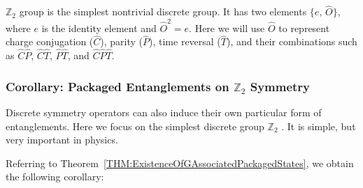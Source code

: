 \documentclass[12pt,a4paper]{article}
\begin{document}
$\mathbb{Z}_2$ group is the simplest nontrivial discrete group.
It has two elements $\{e,\,\hat{O}\}$, where $e$ is the identity element and $\hat{O}^2 = e$.
Here we will use $\hat{O}$ to represent charge conjugation ($\hat{C}$), parity ($\hat{P}$), time reversal ($\hat{T}$), and their combinations such as $\hat{C}\hat{P}$, $\hat{C}\hat{T}$, $\hat{P}\hat{T}$, and $\hat{C}\hat{P}\hat{T}$.



\subsubsection{Corollary: Packaged Entanglements on $\mathbb{Z}_2$ Symmetry}
\label{SEC:PESBasedOnZ2SymmetryOperators}


Discrete symmetry operators can also induce their own particular form of entanglements.
Here we focus on the simplest discrete group $\mathbb{Z}_2$ \cite{Ising1925,Onsager1944}.
It is simple, but very important in physics.


Referring to Theorem~\ref{THM:ExistenceOfGAssociatedPackagedStates}, we obtain the following corollary:
\end{document}
